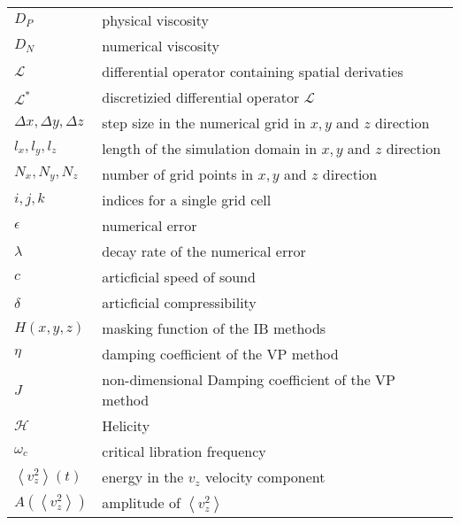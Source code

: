 \begin{longtable}[h]{p{}p{}}
  $D_P$ & physical viscosity\\
  $D_N$ & numerical viscosity\\


  $\mathcal{L}$ & differential operator containing spatial derivaties\\
  $\mathcal{L}^*$ & discretizied differential operator $\mathcal{L}$\\

  $\Delta x, \Delta y, \Delta z$ & step size in the numerical grid in $x, y$ and $z$ direction\\
  $l_x, l_y, l_z$ & length of the simulation domain in $x, y$ and $z$ direction\\
  $N_x, N_y, N_z$ & number of grid points in $x, y$ and $z$ direction\\
  $i, j, k$ & indices for a single grid cell \\

  $\epsilon$ & numerical error\\
  $\lambda$ & decay rate of the numerical error\\

  $c$ & articficial speed of sound\\
  $\delta$ & articficial compressibility\\

  $H(x, y, z)$ & masking function of the IB methods\\
  $\eta$ & damping coefficient of the VP method\\
  $J$ & non-dimensional Damping coefficient of the VP method\\

  $\mathcal{H}$ & Helicity\\
  $\omega_c$ & critical libration frequency\\

  $\left<v_z^2\right>(t)$ & energy in the $v_z$ velocity component\\
  $A\left(\left<v_z^2\right> \right)$ & amplitude of $\left<v_z^2 \right>$ \\

\end{longtable}
